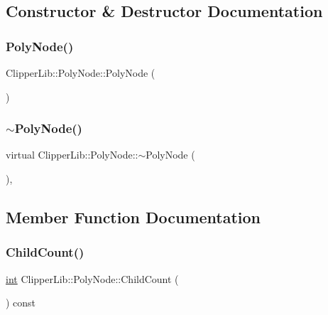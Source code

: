 \subsection{Constructor \& Destructor Documentation}
\mbox{\label{class_clipper_lib_1_1_poly_node_a12b3350e7ab93fb0002b2b4d7dcf13ba}} 
\subsubsection{\texorpdfstring{PolyNode()}{PolyNode()}}
{\footnotesize\ttfamily Clipper\+Lib\+::\+Poly\+Node\+::\+Poly\+Node (\begin{DoxyParamCaption}{ }\end{DoxyParamCaption})}

\mbox{\label{class_clipper_lib_1_1_poly_node_abca566308c95d19c72dee88217b23064}} 
\subsubsection{\texorpdfstring{$\sim$PolyNode()}{~PolyNode()}}
{\footnotesize\ttfamily virtual Clipper\+Lib\+::\+Poly\+Node\+::$\sim$\+Poly\+Node (\begin{DoxyParamCaption}{ }\end{DoxyParamCaption})\hspace{0.3cm}{\ttfamily [inline]}, {\ttfamily [virtual]}}



\subsection{Member Function Documentation}
\mbox{\label{class_clipper_lib_1_1_poly_node_a19128db6fb2aca66555231edaffa7ade}} 
\subsubsection{\texorpdfstring{ChildCount()}{ChildCount()}}
{\footnotesize\ttfamily \mbox{\hyperlink{draw_8hh_aa620a13339ac3a1177c86edc549fda9b}{int}} Clipper\+Lib\+::\+Poly\+Node\+::\+Child\+Count (\begin{DoxyParamCaption}{ }\end{DoxyParamCaption}) const}

